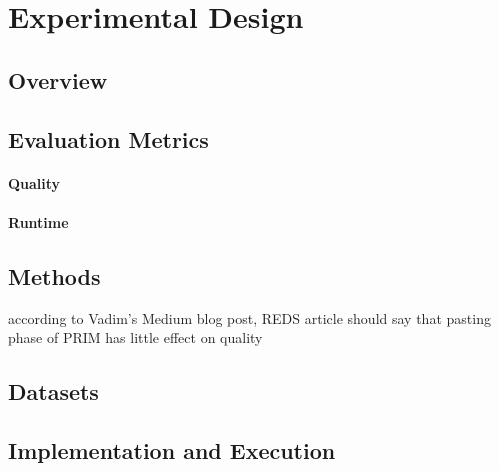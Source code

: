 \documentclass{article}
\theoremstyle{definition}
\begin{document}
\cite{bailey2014alternative} \cite{grossi2017survey}
\cite{guidotti2022counterfactual}
\cite{narodytska2018learning} \cite{schidler2021sat} \cite{yu2021learning}

\section{Experimental Design}
\label{sec:osd:experimental-design}

\subsection{Overview}
\label{sec:osd:experimental-design:overview}

\subsection{Evaluation Metrics}
\label{sec:osd:experimental-design:evaluation}

\paragraph{Quality}

\paragraph{Runtime}

\subsection{Methods}
\label{sec:osd:experimental-design:methods}

according to Vadim's Medium blog post, REDS article should say that pasting phase of PRIM has little effect on quality

\subsection{Datasets}
\label{sec:osd:experimental-design:datasets}

\subsection{Implementation and Execution}
\label{sec:osd:experimental-design:implementation}

\cite{bestuzheva2021scip}
\cite{deMoura2008z3}
\cite{bjorner2015nuz}
\cite{perron2022or-tools}
\cite{lemmerich2019pysubgroup}
\end{document}
